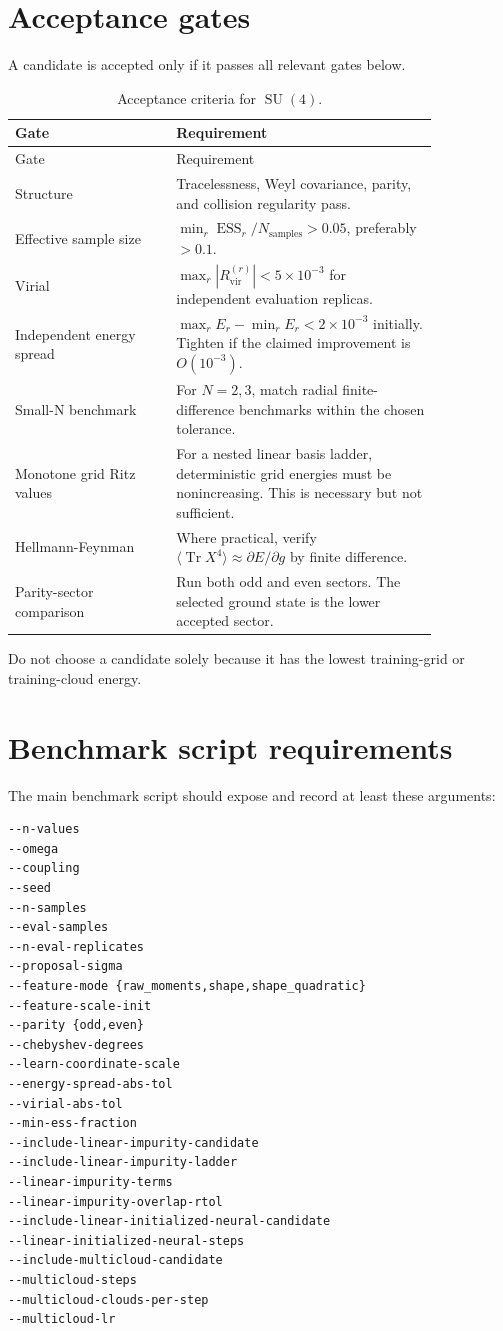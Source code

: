 \documentclass[11pt]{article}
\newcommand{\Tr}{\operatorname{Tr}}
\newcommand{\Rvir}{R_{\mathrm{vir}}}
\newcommand{\ESS}{\operatorname{ESS}}
\newcommand{\SU}{\operatorname{SU}}
\begin{document}
\section{Acceptance gates}

A candidate is accepted only if it passes all relevant gates below.

\begin{longtable}{p{0.32\linewidth}p{0.52\linewidth}}
\caption{Acceptance criteria for \(\SU(4)\).}\label{tab:gates}\\
\toprule
Gate & Requirement \\
\midrule
\endfirsthead
\toprule
Gate & Requirement \\
\midrule
\endhead
Structure & Tracelessness, Weyl covariance, parity, and collision regularity pass. \\
Effective sample size & \(\min_r \ESS_r/N_{\mathrm{samples}}>0.05\), preferably \(>0.1\). \\
Virial & \(\max_r |\Rvir^{(r)}|<5\times10^{-3}\) for independent evaluation replicas. \\
Independent energy spread & \(\max_rE_r-\min_rE_r < 2\times10^{-3}\) initially. Tighten if the claimed improvement is \(O(10^{-3})\). \\
Small-N benchmark & For \(N=2,3\), match radial finite-difference benchmarks within the chosen tolerance. \\
Monotone grid Ritz values & For a nested linear basis ladder, deterministic grid energies must be nonincreasing. This is necessary but not sufficient. \\
Hellmann-Feynman & Where practical, verify \(\langle\Tr X^4\rangle\approx \partial E/\partial g\) by finite difference. \\
Parity-sector comparison & Run both odd and even sectors. The selected ground state is the lower accepted sector. \\
\bottomrule
\end{longtable}

Do not choose a candidate solely because it has the lowest training-grid or training-cloud energy.

\section{Benchmark script requirements}

The main benchmark script should expose and record at least these arguments:

\begin{lstlisting}[style=bashstyle]
--n-values
--omega
--coupling
--seed
--n-samples
--eval-samples
--n-eval-replicates
--proposal-sigma
--feature-mode {raw_moments,shape,shape_quadratic}
--feature-scale-init
--parity {odd,even}
--chebyshev-degrees
--learn-coordinate-scale
--energy-spread-abs-tol
--virial-abs-tol
--min-ess-fraction
--include-linear-impurity-candidate
--include-linear-impurity-ladder
--linear-impurity-terms
--linear-impurity-overlap-rtol
--include-linear-initialized-neural-candidate
--linear-initialized-neural-steps
--include-multicloud-candidate
--multicloud-steps
--multicloud-clouds-per-step
--multicloud-lr
\end{lstlisting}
\end{document}
